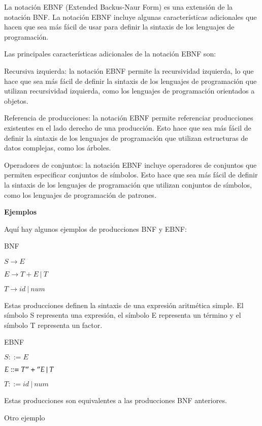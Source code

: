 La notación EBNF (Extended Backus-Naur Form) es una extensión de la notación BNF. La notación EBNF incluye algunas características adicionales que hacen que sea más fácil de usar para definir la sintaxis de los lenguajes de programación.

Las principales características adicionales de la notación EBNF son:

    Recursiva izquierda: la notación EBNF permite la recursividad izquierda, lo que hace que sea más fácil de definir la sintaxis de los lenguajes de programación que utilizan recursividad izquierda, como los lenguajes de programación orientados a objetos.
   
    Referencia de producciones: la notación EBNF permite referenciar producciones existentes en el lado derecho de una producción. Esto hace que sea más fácil de definir la sintaxis de los lenguajes de programación que utilizan estructuras de datos complejas, como los árboles.
    
    Operadores de conjuntos: la notación EBNF incluye operadores de conjuntos que permiten especificar conjuntos de símbolos. Esto hace que sea más fácil de definir la sintaxis de los lenguajes de programación que utilizan conjuntos de símbolos, como los lenguajes de programación de patrones.

\textbf{Ejemplos}

Aquí hay algunos ejemplos de producciones BNF y EBNF:

BNF

\begin{center}
    $S \xrightarrow{} E$
    
    $E \xrightarrow{} T + E\: |\: T$
    
    $T \xrightarrow{} id\: |\: num$
\end{center}

Estas producciones definen la sintaxis de una expresión aritmética simple. El símbolo S representa una expresión, el símbolo E representa un término y el símbolo T representa un factor.

EBNF

\begin{center}
    $S ::= E$
    
    $E ::= T "+" E\: |\: T$
    
    $T ::= id\: |\: num$
\end{center}

Estas producciones son equivalentes a las producciones BNF anteriores.

Otro ejemplo

